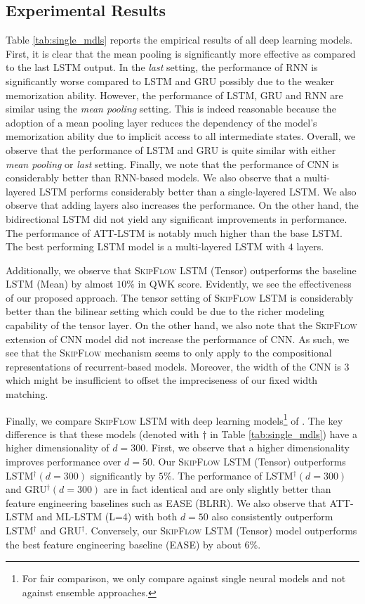 \documentclass[letterpaper]{article}
\begin{document}
\subsection{Experimental Results}
Table \ref{tab:single_mdls} reports the empirical results of all deep learning models. First, it is clear that the mean pooling is significantly more effective as compared to the last LSTM output. In the \textit{last} setting, the performance of RNN is significantly worse compared to LSTM and GRU possibly due to the weaker memorization ability. However, the performance of LSTM, GRU and RNN are similar using the \textit{mean pooling} setting.  This is indeed reasonable because the adoption of a mean pooling layer reduces the dependency of the model's memorization ability due to implicit access to all intermediate states. Overall, we observe that the performance of LSTM and GRU is quite similar with either \textit{mean pooling} or \textit{last} setting. Finally, we note that the performance of CNN is considerably better than RNN-based models. We also observe that a multi-layered LSTM performs considerably better than a single-layered LSTM. We also observe that adding layers also increases the performance. On the other hand, the bidirectional LSTM did not yield any significant improvements in performance. The performance of ATT-LSTM is notably much higher than the base LSTM. The best performing LSTM model is a multi-layered LSTM with $4$ layers. 

Additionally, we observe that \textsc{SkipFlow} LSTM (Tensor) outperforms the baseline LSTM (Mean) by almost $10\%$ in QWK score. Evidently, we see the effectiveness of our proposed approach. The tensor setting of \textsc{SkipFlow} LSTM is considerably better than the bilinear setting which could be due to the richer modeling capability of the tensor layer. On the other hand, we also note that the \textsc{SkipFlow} extension of CNN model did not increase the performance of CNN. As such, we see that the \textsc{SkipFlow} mechanism seems to only apply to the compositional representations of recurrent-based models. Moreover, the width of the CNN is $3$ which might be insufficient to offset the impreciseness of our fixed width matching. 

Finally, we compare \textsc{SkipFlow} LSTM with deep learning models\footnote{For fair comparison, we only compare against single neural models and not against ensemble approaches.} of \cite{DBLP:conf/emnlp/TaghipourN16}. The key difference is that these models (denoted with $\dagger$ in Table \ref{tab:single_mdls}) have a higher dimensionality of $d=300$. First, we observe that a higher dimensionality improves performance over $d=50$. Our \textsc{SkipFlow} LSTM (Tensor) outperforms LSTM$^{\dagger} (d=300)$ significantly by $5\%$. The performance of LSTM$^{\dagger} (d=300)$ and GRU$^{\dagger} (d=300)$ are in fact identical and are only slightly better than feature engineering baselines such as EASE (BLRR). We also observe that ATT-LSTM and ML-LSTM (L=4) with both $d=50$ also consistently outperform LSTM$^{\dagger}$ and GRU$^{\dagger}$. Conversely, our \textsc{SkipFlow} LSTM (Tensor) model outperforms the best feature engineering baseline (EASE) by about $6\%$. 
\end{document}

